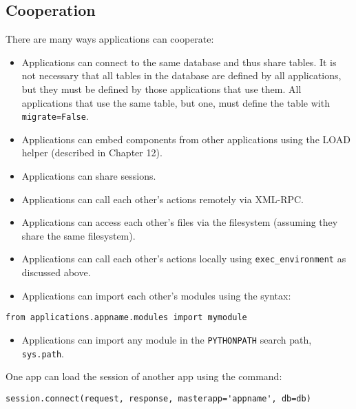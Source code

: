 \documentclass[justified,sixbynine,notoc]{tufte-book}
\def\ft{\small\tt}
\def\inxx#1{\index{#1}}
\begin{document}
\begin{fullwidth}
\goodbreak\section{Cooperation}

\inxx{cooperation}

There are many ways applications can cooperate:
\begin{itemize}
\item Applications can connect to the same database and thus share tables. It is not necessary that all tables in the database are defined by all applications, but they must be defined by those applications that use them. All applications that use the same table, but one, must define the table with {\ft migrate=False}.

\item Applications can embed components from other applications using the LOAD helper (described in Chapter 12).

\item Applications can share sessions.

\item Applications can call each other's actions remotely via XML-RPC.

\item Applications can access each other's files via the filesystem (assuming they share the same filesystem).

\item Applications can call each other's actions locally using {\ft exec\_environment} as discussed above.

\item Applications can import each other's modules using the syntax:
\end{itemize}
\begin{lstlisting}
from applications.appname.modules import mymodule
\end{lstlisting}

\begin{itemize}
\item Applications can import any module in the {\ft PYTHONPATH} search path, {\ft sys.path}.
\end{itemize}

One app can load the session of another app using the command:

\begin{lstlisting}
session.connect(request, response, masterapp='appname', db=db)
\end{lstlisting}


\end{fullwidth}
\end{document}
